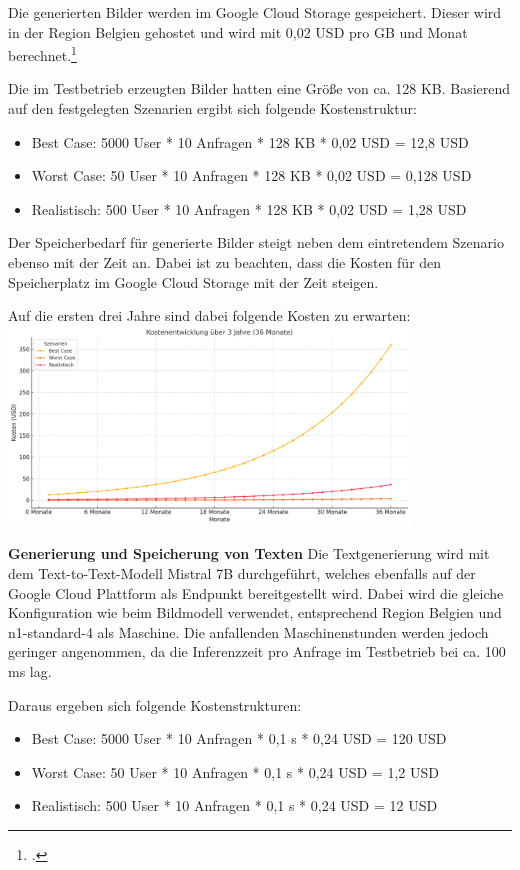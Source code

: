 Die generierten Bilder werden im Google Cloud Storage gespeichert.
Dieser wird in der Region Belgien gehostet und wird mit 0,02 USD pro GB und Monat berechnet.\footcite{GoogleCloudStorage2025}

Die im Testbetrieb erzeugten Bilder hatten eine Größe von ca. 128 KB.
Basierend auf den festgelegten Szenarien ergibt sich folgende Kostenstruktur:
\begin{itemize}
    \item Best Case: 5000 User * 10 Anfragen * 128 KB * 0,02 USD = 12,8 USD
    \item Worst Case: 50 User * 10 Anfragen * 128 KB * 0,02 USD = 0,128 USD
    \item Realistisch: 500 User * 10 Anfragen * 128 KB * 0,02 USD = 1,28 USD
\end{itemize}

Der Speicherbedarf für generierte Bilder steigt neben dem eintretendem Szenario ebenso mit der Zeit an.
Dabei ist zu beachten, dass die Kosten für den Speicherplatz im Google Cloud Storage mit der Zeit steigen.

Auf die ersten drei Jahre sind dabei folgende Kosten zu erwarten:
\includegraphics[width=0.8\textwidth]{abbildungen/KostenSpeicher}

\textbf{Generierung und Speicherung von Texten}
Die Textgenerierung wird mit dem Text-to-Text-Modell Mistral 7B durchgeführt, welches ebenfalls auf der Google Cloud Plattform als Endpunkt bereitgestellt wird.
Dabei wird die gleiche Konfiguration wie beim Bildmodell verwendet, entsprechend Region Belgien und n1-standard-4 als Maschine.
Die anfallenden Maschinenstunden werden jedoch geringer angenommen, da die Inferenzzeit pro Anfrage im Testbetrieb bei ca. 100 ms lag.

Daraus ergeben sich folgende Kostenstrukturen:
\begin{itemize}
    \item Best Case: 5000 User * 10 Anfragen * 0,1 s * 0,24 USD = 120 USD
    \item Worst Case: 50 User * 10 Anfragen * 0,1 s * 0,24 USD = 1,2 USD
    \item Realistisch: 500 User * 10 Anfragen * 0,1 s * 0,24 USD = 12 USD
\end{itemize}

